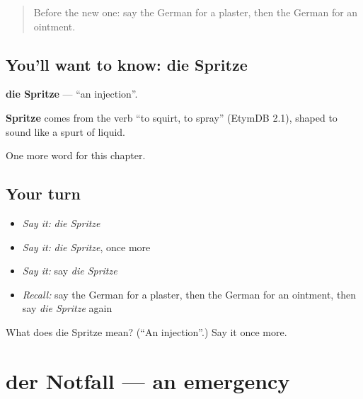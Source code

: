 \label{lesson:GE-C206-spritze}



\begin{quote}
Before the new one: say the German for a plaster, then the German for an ointment.
\end{quote}

\subsection*{You'll want to know: die Spritze}
\textbf{die Spritze} — \textquotedblleft{}an injection\textquotedblright{}.

\begin{cousinweb}
\textbf{Spritze} comes from the verb \textquotedblleft{}to squirt, to spray\textquotedblright{} (EtymDB 2.1), shaped to sound like a spurt of liquid.
\end{cousinweb}

\begin{grammarlens}[title={What you've built}]
One more word for this chapter.
\end{grammarlens}

\subsection*{Your turn}
\begin{itemize}
\raggedright
  \item \emph{Say it:} \emph{die Spritze}
  \item \emph{Say it:} \emph{die Spritze}, once more
  \item \emph{Say it:} say \emph{die Spritze}
  \item \emph{Recall:} say the German for a plaster, then the German for an ointment, then say \emph{die Spritze} again
\end{itemize}

\begin{tcolorbox}[breakable,colback=teal!4,colframe=teal!35!black,title={Before you move on}]
What does die Spritze mean? (\textquotedblleft{}An injection\textquotedblright{}.) Say it once more.
\end{tcolorbox}
\section[der Notfall]{der Notfall — an emergency}

\label{lesson:GE-C206-notfall}



